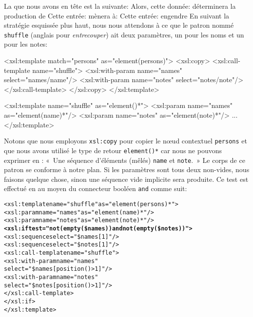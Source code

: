 La \DTD que nous avons en tête est la suivante:
\noindent Alors, cette donnée:
\noindent déterminera la production de
\noindent Cette entrée:
\noindent mènera à:
\noindent Cette entrée:
\noindent engendre
En suivant la stratégie esquissée plus haut, nous nous attendons à ce
que le patron nommé \texttt{shuffle} (anglais pour \emph{entrecouper})
ait deux paramètres, un pour les noms et un pour les notes:
\begin{sverb}
  <xsl:template match="persons" as="element(persons)">
    <xsl:copy>
      <xsl:call-template name="shuffle">
        <xsl:with-param name="names" select="names/name"/>
        <xsl:with-param name="notes" select="notes/note"/>
      </xsl:call-template>
    </xsl:copy>
  </xsl:template>

  <xsl:template name="shuffle" as="element()*">
    <xsl:param name="names" as="element(name)*"/>
    <xsl:param name="notes" as="element(note)*"/>
    ...
  </xsl:template>
\end{sverb}
Notons que nous employons \texttt{xsl:copy} pour copier le nœud
contextuel \texttt{persons} et que nous avons utilisé le type de
retour \texttt{element()*} car nous ne pouvons exprimer en \XPath:
«~Une séquence d'éléments (mêlés) \texttt{name} et \texttt{note}.~» Le
corps de ce patron se conforme à notre plan. Si les paramètres sont
tous deux non-vides, nous faisons quelque chose, sinon une séquence
vide implicite sera produite. Ce test est effectué en \XPath au moyen
du connecteur booléen \texttt{and} comme suit:
\begin{alltt}
\small  <xsl:template name="shuffle" as="element(persons)*">
    <xsl:param name="names" as="element(name)*"/>
    <xsl:param name="notes" as="element(note)*"/>
    \textbf{<xsl:if test="not(empty(\$names)) and not(empty(\$notes))">}
      <xsl:sequence select="\$names[1]"/>
      <xsl:sequence select="\$notes[1]"/>
      <xsl:call-template name="shuffle">
        <xsl:with-param name="names"
                        select="\$names[position()>1]"/>
        <xsl:with-param name="notes"
                        select="\$notes[position()>1]"/>
      </xsl:call-template>
    </xsl:if>
  </xsl:template>
\end{alltt}

